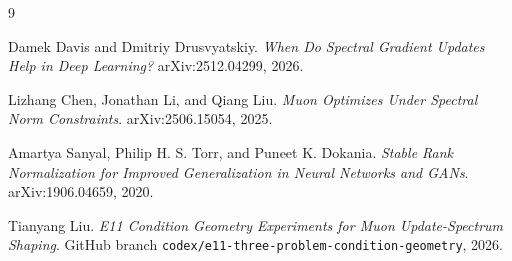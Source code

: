 \begin{thebibliography}{9}

Damek Davis and Dmitriy Drusvyatskiy.
\newblock \emph{When Do Spectral Gradient Updates Help in Deep Learning?}
\newblock arXiv:2512.04299, 2026.

Lizhang Chen, Jonathan Li, and Qiang Liu.
\newblock \emph{Muon Optimizes Under Spectral Norm Constraints}.
\newblock arXiv:2506.15054, 2025.

Amartya Sanyal, Philip H. S. Torr, and Puneet K. Dokania.
\newblock \emph{Stable Rank Normalization for Improved Generalization in Neural Networks and GANs}.
\newblock arXiv:1906.04659, 2020.

Tianyang Liu.
\newblock \emph{E11 Condition Geometry Experiments for Muon Update-Spectrum Shaping}.
\newblock GitHub branch \texttt{codex/e11-three-problem-condition-geometry}, 2026.

\end{thebibliography}
